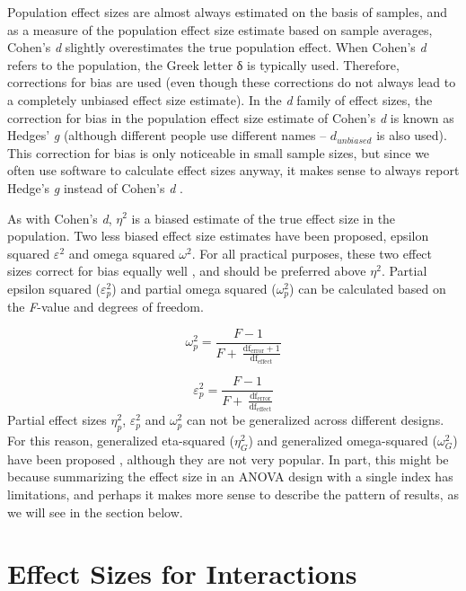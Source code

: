 \documentclass[
  oneside]{book}
\begin{document}
Population effect sizes are almost always estimated on the basis of samples, and as a measure of the population effect size estimate based on sample averages, Cohen's \emph{d} slightly overestimates the true population effect. When Cohen's \emph{d} refers to the population, the Greek letter δ is typically used. Therefore, corrections for bias are used (even though these corrections do not always lead to a completely unbiased effect size estimate). In the \emph{d} family of effect sizes, the correction for bias in the population effect size estimate of Cohen's \emph{d} is known as Hedges' \emph{g} (although different people use different names -- \(d_{unbiased}\) is also used). This correction for bias is only noticeable in small sample sizes, but since we often use software to calculate effect sizes anyway, it makes sense to always report Hedge's \emph{g} instead of Cohen's \emph{d} \citep{thompson_effect_2007}.

As with Cohen's \emph{d}, \(\eta^2\) is a biased estimate of the true effect size in the population. Two less biased effect size estimates have been proposed, epsilon squared \(\varepsilon^{2}\) and omega squared \(\omega^{2}\). For all practical purposes, these two effect sizes correct for bias equally well \citep{okada_is_2013, albers_when_2018}, and should be preferred above \(\eta^2\). Partial epsilon squared (\(\varepsilon_{p}^{2}\)) and partial omega squared (\(\omega_{p}^{2}\)) can be calculated based on the \emph{F}-value and degrees of freedom.

\[
\omega_{p}^{2} = \frac{F - 1}{F + \ \frac{\text{df}_{\text{error}} + 1}{\text{df}_{\text{effect}}}}
\]

\[
\varepsilon_{p}^{2} = \frac{F - 1}{F + \ \frac{\text{df}_{\text{error}}}{\text{df}_{\text{effect}}}}
\]
Partial effect sizes \(\eta_{p}^{2}\), \(\varepsilon_{p}^{2}\) and \(\omega_{p}^{2}\) can not be generalized across different designs. For this reason, generalized eta-squared (\(\eta_{G}^{2}\)) and generalized omega-squared (\(\omega_{G}^{2}\)) have been proposed \citep{olejnik_generalized_2003}, although they are not very popular. In part, this might be because summarizing the effect size in an ANOVA design with a single index has limitations, and perhaps it makes more sense to describe the pattern of results, as we will see in the section below.

\hypertarget{effect-sizes-for-interactions}{%
\section{Effect Sizes for Interactions}\label{effect-sizes-for-interactions}}
\end{document}
